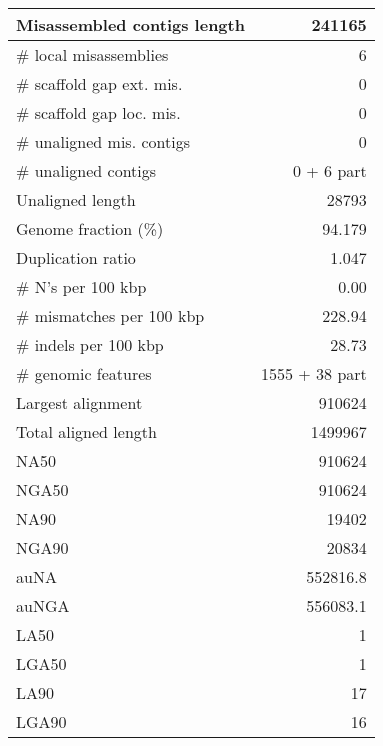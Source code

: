 \documentclass[12pt,a4paper]{article}
\begin{document}
\begin{table}[ht]
\begin{center}
\begin{tabular}{|l*{1}{|r}|}
Misassembled contigs length & 241165 \\ \hline
\# local misassemblies & 6 \\ \hline
\# scaffold gap ext. mis. & 0 \\ \hline
\# scaffold gap loc. mis. & 0 \\ \hline
\# unaligned mis. contigs & 0 \\ \hline
\# unaligned contigs & 0 + 6 part \\ \hline
Unaligned length & 28793 \\ \hline
Genome fraction (\%) & 94.179 \\ \hline
Duplication ratio & 1.047 \\ \hline
\# N's per 100 kbp & 0.00 \\ \hline
\# mismatches per 100 kbp & 228.94 \\ \hline
\# indels per 100 kbp & 28.73 \\ \hline
\# genomic features & 1555 + 38 part \\ \hline
Largest alignment & 910624 \\ \hline
Total aligned length & 1499967 \\ \hline
NA50 & 910624 \\ \hline
NGA50 & 910624 \\ \hline
NA90 & 19402 \\ \hline
NGA90 & 20834 \\ \hline
auNA & 552816.8 \\ \hline
auNGA & 556083.1 \\ \hline
LA50 & 1 \\ \hline
LGA50 & 1 \\ \hline
LA90 & 17 \\ \hline
LGA90 & 16 \\ \hline
\end{tabular}
\end{center}
\end{table}
\end{document}
